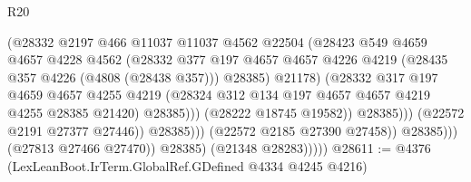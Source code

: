\begin{lexlean}{R20}
\begin{coremodule}
                                          (@28332
                                            @2197
                                            @466
                                            @11037
                                            @11037
                                            @4562
                                            @22504
                                            (@28423
                                              @549
                                              @4659
                                              @4657
                                              @4228
                                              @4562
                                              (@28332
                                                @377
                                                @197
                                                @4657
                                                @4657
                                                @4226
                                                @4219
                                                (@28435 @357 @4226 (@4808 (@28438 @357)))
                                                @28385)
                                              @21178)
                                            (@28332
                                              @317
                                              @197
                                              @4659
                                              @4657
                                              @4255
                                              @4219
                                              (@28324
                                                @312
                                                @134
                                                @197
                                                @4657
                                                @4657
                                                @4219
                                                @4255
                                                @28385
                                                @21420)
                                              @28385)))
                                        (@28222 @18745 @19582))
                                      @28385)))
                                (@22572 @2191 @27377 @27446))
                              @28385)))
                        (@22572 @2185 @27390 @27458))
                      @28385)))
                (@27813 @27466 @27470))
              @28385)
            (@21348 @28283)))))
@28611 := @4376 (LexLeanBoot.IrTerm.GlobalRef.GDefined @4334 @4245 @4216)

\end{coremodule}
\end{lexlean}
